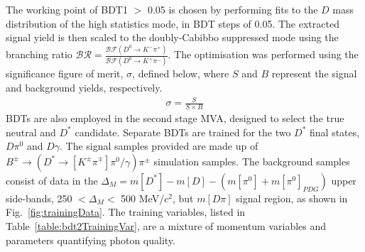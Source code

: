 \documentclass[oneside,12pt]{article}
\begin{document}
The working point of BDT1 $>$ 0.05 is chosen by performing fits to the $D$ mass
distribution of the high statistics mode, in BDT steps of 0.05. The extracted
signal yield is then scaled to the doubly-Cabibbo suppressed mode using the branching ratio
$\mathcal{BR} = \frac{\mathcal{BF}(D^0 \rightarrow K^- \pi^+)}{\mathcal{BF}(D^0
\rightarrow K^+ \pi^-)}$. The optimisation was performed using the significance
figure of merit, $\sigma$, defined below, where $S$ and $B$ represent the signal
and background yields, respectively.
\begin{align}
\sigma = \frac{S}{S \times B}
\label{D_branching_ratio}
\end{align}
BDTs are also employed in the second stage MVA, designed to select the true
neutral and $D^*$ candidate. Separate BDTs are trained for the two $D^*$ final
states, $D\pi^0$ and $D\gamma$. The signal samples provided are made up of
$B^{\pm}\rightarrow (D^*\rightarrow [K^{\pm}\pi^{\mp}]\pi^0/\gamma)\pi^{\pm}$
simulation samples. The background samples consist of data in the
$\Delta_M=m[D^{*}] - m[D]- (m[\pi^0] + m[\pi^0]_{PDG})$ upper side-bands, 250 $
< \Delta_{M} < $ 500 MeV/$c^2$, but $m[D\pi]$ signal region, as shown in
Fig.~\ref{fig:trainingData}. The training variables, listed in
Table~\ref{table:bdt2TrainingVar}, are a mixture of momentum variables and
parameters quantifying photon quality. 
\end{document}
